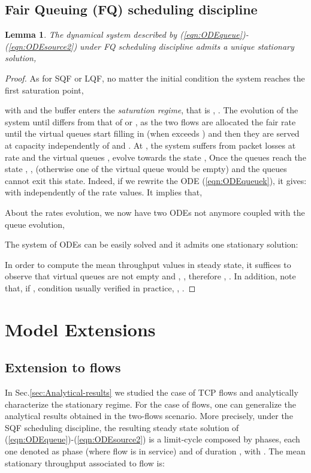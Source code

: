 \documentclass[a4paper,oneside, 11pt]{article}
\newtheorem{lem}[theorem]{Lemma}
\begin{document}
\subsection{Fair Queuing (FQ) scheduling discipline}\label{sec:FQ}
\begin{lem}
 The dynamical system described by (\ref{eqn:ODEqueue})-(\ref{eqn:ODEsource2}) under FQ scheduling discipline admits a unique stationary solution,

\end{lem}
\begin{proof}
As for SQF or LQF, no matter the initial condition the system reaches the first saturation point,

with 
and the buffer enters  the \textit{saturation regime}, that is , .
The evolution of the system until  differs from that of  or ,
as the two flows are allocated the fair rate until the virtual queues start filling in (when  exceeds ) and then they are served at capacity  independently of  and .
At , the system suffers from packet losses at rate  and the virtual queues ,  evolve towards the state
, 
Once the queues reach the state , ,  (otherwise one of the virtual queue would be empty) and the queues cannot exit this state.
Indeed, if we rewrite the ODE (\ref{eqn:ODEqueuek}), it gives:
with  independently of the rate values.
It implies that,

About the rates evolution, we now have two ODEs not anymore coupled with the queue evolution,

The system of ODEs can be easily solved and it admits one stationary solution:

In order to compute the mean throughput values in steady state, it suffices to observe that virtual queues are not empty and , ,
therefore ,
 . In addition,
note that, if , condition usually verified in practice, , .
\end{proof}









\section{Model Extensions}\label{sec:extensions}
\subsection{Extension to  flows}
In Sec.\ref{sec:Analytical-results} we studied the case of  TCP flows and analytically characterize
the stationary regime. For the case of  flows,
one can generalize the analytical results obtained in the two-flows scenario.
More precisely, under the SQF scheduling discipline, the resulting steady state
solution of (\ref{eqn:ODEqueue})-(\ref{eqn:ODEsource2}) is a limit-cycle
composed by  phases,
each one denoted as  phase (where flow  is in service) and of duration , with .
The mean stationary throughput associated to flow  is:
\end{document}
